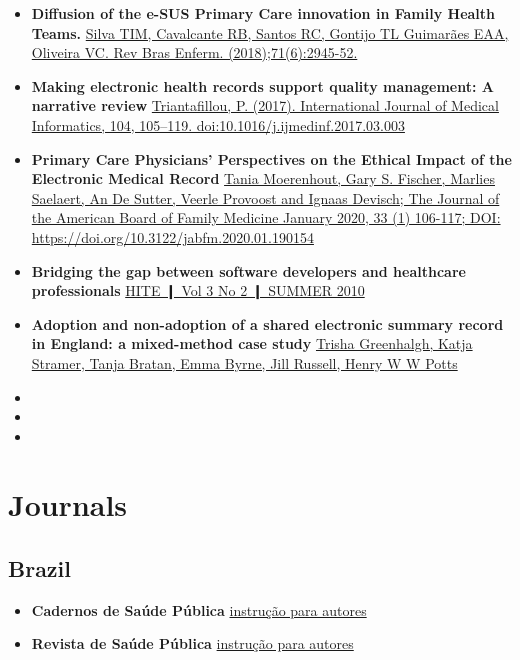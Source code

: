 \documentclass[]{book}
\begin{document}
\begin{itemize}
\item
  \textbf{Diffusion of the e-SUS Primary Care innovation in Family Health Teams.} \href{http://www.scielo.br/pdf/reben/v71n6/0034-7167-reben-71-06-2945.pdf}{Silva TIM, Cavalcante RB, Santos RC, Gontijo TL Guimarães EAA, Oliveira VC. Rev Bras Enferm. (2018);71(6):2945-52.}
\item
  \textbf{Making electronic health records support quality management: A narrative review} \href{https://sci-hub.tw/10.1016/j.ijmedinf.2017.03.003}{Triantafillou, P. (2017). International Journal of Medical Informatics, 104, 105--119. doi:10.1016/j.ijmedinf.2017.03.003}
\item
  \textbf{Primary Care Physicians' Perspectives on the Ethical Impact of the Electronic Medical Record} \href{https://www.jabfm.org/content/33/1/106.long}{Tania Moerenhout, Gary S. Fischer, Marlies Saelaert, An De Sutter, Veerle Provoost and Ignaas Devisch; The Journal of the American Board of Family Medicine January 2020, 33 (1) 106-117; DOI: https://doi.org/10.3122/jabfm.2020.01.190154}
\item
  \textbf{Bridging the gap between software developers and healthcare professionals} \href{https://www.researchgate.net/profile/William_Goossen2/publication/235672805_Bridging_the_gap_between_software_developers_and_healthcare_professionals_Model_Driven_Application_Development/links/551dc2690cf29dcabb033004.pdf}{HITE ❙ Vol 3 No 2 ❙ SUMMER 2010}
\item
  \textbf{Adoption and non-adoption of a shared electronic summary record in England: a mixed-method case study} \href{https://www.bmj.com/content/bmj/340/bmj.c3111.full.pdf}{Trisha Greenhalgh, Katja Stramer, Tanja Bratan, Emma Byrne, Jill Russell, Henry W W Potts}
\item
\item
\item
\end{itemize}

\hypertarget{journals}{%
\chapter{Journals}\label{journals}}

\hypertarget{brazil}{%
\section*{Brazil}\label{brazil}}

\begin{itemize}
\item
  \textbf{Cadernos de Saúde Pública} \href{http://cadernos.ensp.fiocruz.br/csp/submissao/instrucao-para-autores}{instrução para autores}
\item
  \textbf{Revista de Saúde Pública} \href{http://www.rsp.fsp.usp.br/instrucoes-aos-autores/\#artigos-originais}{instrução para autores}
\end{itemize}
\end{document}
